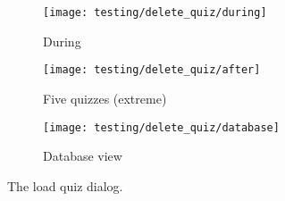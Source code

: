 \begin{figure}[!htbp]
\centering
\begin{subfigure}{0.5\textwidth}
  \centering
  \texttt{[image: testing/delete\_quiz/during]}
  \caption{During}
  \label{fig:sub1}
\end{subfigure}%
\begin{subfigure}{0.5\textwidth}
  \centering
  \texttt{[image: testing/delete\_quiz/after]}
  \caption{Five quizzes (extreme)}
  \label{fig:sub2}
\end{subfigure}
\begin{subfigure}{0.5\textwidth}
  \centering
  \texttt{[image: testing/delete\_quiz/database]}
  \caption{Database view}
  \label{fig:sub2}
\end{subfigure}
\caption{The load quiz dialog.}
\label{fig:test}
\end{figure}


